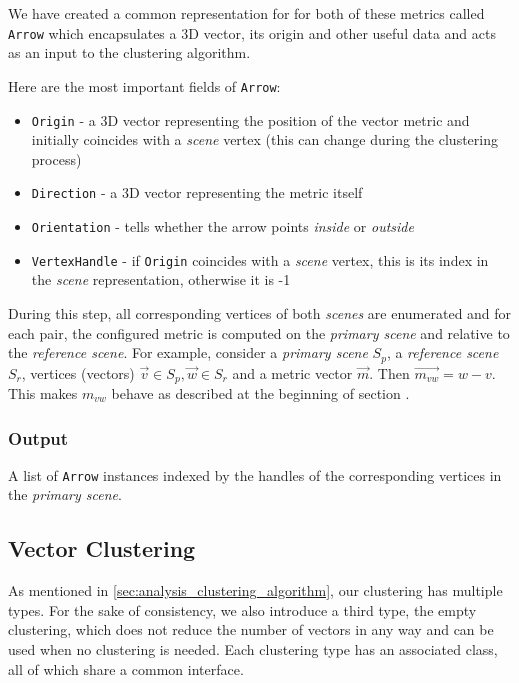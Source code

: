 We have created a common representation for for both of these metrics called \verb+Arrow+ which encapsulates a 3D vector, its origin and other useful data and acts as an input to the clustering algorithm.

Here are the most important fields of \verb+Arrow+:

\begin{itemize}
\item \verb+Origin+ - a 3D vector representing the position of the vector metric and initially coincides with a {\it scene} vertex (this can change during the clustering process)
\item \verb+Direction+ - a 3D vector representing the metric itself
\item \verb+Orientation+ - tells whether the arrow points {\it inside} or {\it outside}
\item \verb+VertexHandle+ - if \verb+Origin+ coincides with a {\it scene} vertex, this is its index in the {\it scene} representation, otherwise it is -1
\end{itemize}

During this step, all corresponding vertices of both {\it scenes} are enumerated and for each pair, the configured metric is computed on the {\it primary scene} and relative to the {\it reference scene}. For example, consider a {\it primary scene} \(S_p\), a {\it reference scene} \(S_r\), vertices (vectors) \(\overrightarrow{v} \in S_p, \overrightarrow{w} \in S_r\) and a metric vector \(\overrightarrow{m}\). Then \(\overrightarrow{m_{vw}} = w - v\). This makes \(m_{vw}\) behave as described at the beginning of section \label{sec:analysis}.

\subsubsection{Output}

A list of \verb+Arrow+ instances indexed by the handles of the corresponding vertices in the {\it primary scene}.

\subsection{Vector Clustering}
\label{sec:implementation_clustering}

As mentioned in \ref{sec:analysis_clustering_algorithm}, our clustering has multiple types. For the sake of consistency, we also introduce a third type, the empty clustering, which does not reduce the number of vectors in any way and can be used when no clustering is needed. Each clustering type has an associated class, all of which share a common interface.

